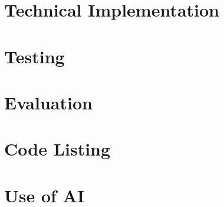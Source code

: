 \documentclass[10pt]{report}
\newcommand{\Input}[1]{}
\begin{document}
\chapter{Technical Implementation}
\Input{3-implementation.tex}

\chapter{Testing}
\Input{4-testing.tex}

\chapter{Evaluation}
\Input{5-evaluation.tex}

\appendix

\chapter{Code Listing}
\Input{a-listing.tex}

\chapter{Use of AI}
\Input{b-ai.tex}

\printbibliography[heading=bibnumbered,title=Bibliography]
\end{document}
